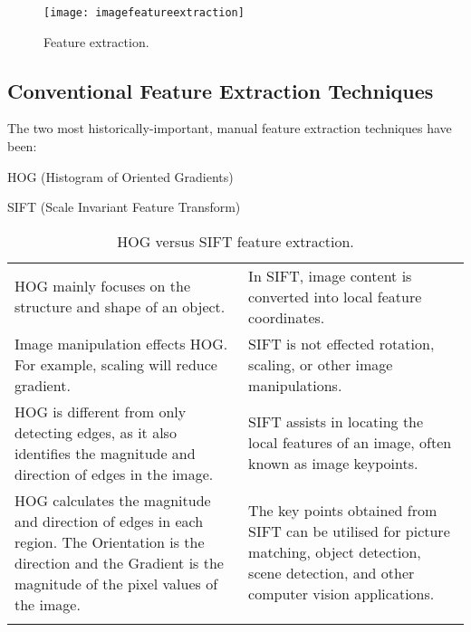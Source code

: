 	\begin{figure}[h]
		\centering
		\texttt{[image: imagefeatureextraction]}
		\caption[Feature extraction]{Feature extraction.}
		\label{fig:imagefeatureextraction}
	\end{figure}

	\subsection{Conventional Feature Extraction Techniques}
The two most historically-important, manual feature extraction techniques have been:
	\begin{bulletedlist}
		\item HOG (Histogram of Oriented Gradients)
		\item SIFT (Scale Invariant Feature Transform)
	\end{bulletedlist}

	\begin{table}
        \centering
        \caption[HOG versus SIFT feature extraction]{HOG versus SIFT feature extraction.}
        \label{tab:hogversussift}
		\begin{tabular}{|p{}|p{}|} \hline
				\tablecolumnheadervlinesone{HOG} & \tablecolumnheadervlinestwo{SIFT} \\ \hline
				HOG mainly focuses on the structure and shape of an object. &
	            In SIFT, image content is converted into local feature coordinates. \\ \hline
				Image manipulation effects HOG.  For example, scaling will reduce gradient. &
				SIFT is not effected rotation, scaling, or other image manipulations. \\ \hline
				HOG is different from only detecting edges, as it also identifies the magnitude and direction of edges in the image. &
	            SIFT assists in locating the local features of an image, often known as image keypoints. \\ \hline
				HOG calculates the magnitude and direction of edges in each region. The Orientation is the direction and the Gradient is the magnitude of the pixel values of the image. &
				The key points obtained from SIFT can be utilised for picture matching, object detection, scene detection, and other computer vision applications. \\ \hline
				\adjustbox{center}{\texttt{[image: hogfeaturedetection]}} &
				\adjustbox{center}{\texttt{[image: siftfeaturedetection]}} \\ \hline
		\end{tabular}
	\end{table}

